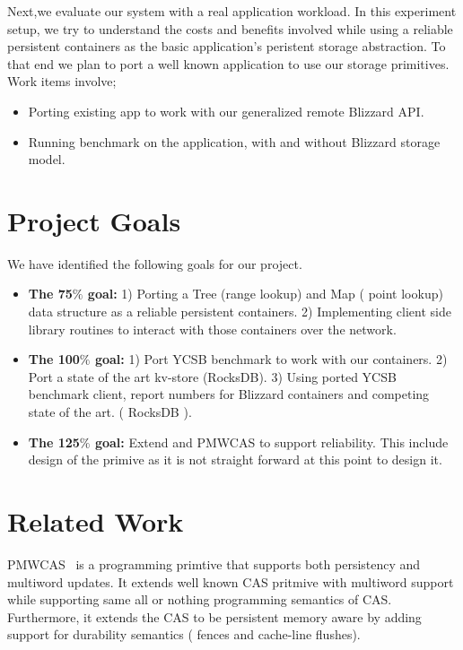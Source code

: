 Next,we evaluate our system with a real application workload. In this experiment setup, we try to understand the costs
and benefits involved while using a reliable persistent containers as the basic application's peristent storage abstraction.
To that end we plan to port a well known application to use our storage primitives. Work items involve;
\begin{itemize}
\item Porting existing app to work with our generalized remote Blizzard API.
\item Running benchmark on the application, with and without Blizzard storage model.
\end{itemize}


\section{Project Goals}
We have identified the following goals for our project.
\begin{itemize}
	\item {\bf The 75$\%$ goal:} 1) Porting a Tree (range lookup) and Map ( point lookup) data structure as a reliable persistent containers. 2) Implementing
			client side library routines to interact with those containers over the network. 

		\item {\bf The 100$\%$ goal:} 1) Port YCSB benchmark to work with our containers. 2) Port a state of the art kv-store (RocksDB). 
				3) Using ported YCSB benchmark client, report numbers for Blizzard containers and competing state of the art. ( RocksDB ).

\item {\bf The 125$\%$ goal:} Extend and PMWCAS to support reliability. This include design of the primive as it is not straight forward at this
		point to design it.
\end{itemize}



\section{Related Work}

PMWCAS~\cite{pmwcas} is a programming primtive that supports both persistency and multiword updates.
It extends well known CAS pritmive with multiword support while supporting same all or nothing
programming semantics of CAS. Furthermore, it extends the CAS to be persistent memory aware by
adding support for durability semantics ( fences and cache-line flushes).

